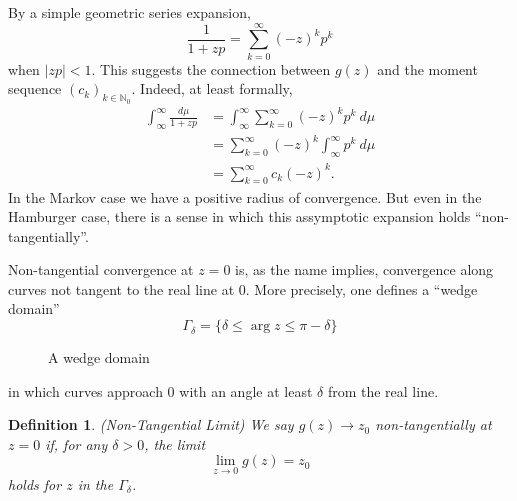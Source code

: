 \documentclass{amsart}
\newtheorem{definition}[theorem]{Definition}
\theoremstyle{remark}
\numberwithin{equation}{section}
\newcommand{\NN}{\mathbb{N}}
\begin{document}
By a simple geometric series expansion,
\[
    \frac1{1 + zp} = \sum_{k = 0}^\infty {(-z)}^k p^k 
\]
when $|zp| < 1$. This suggests the connection between $g(z)$ and the moment sequence ${(c_k)}_{k \in \NN_0}$. Indeed, at least formally,
\begin{align*}
    \int_\infty^\infty\frac{d\mu}{1+zp}
    &= \int_\infty^\infty \sum_{k = 0}^\infty {(-z)}^k p^k ~d\mu \\
    &= \sum_{k = 0}^\infty {(-z)}^k \int_\infty^\infty p^k ~d\mu \\
    &= \sum_{k = 0}^\infty c_k{(-z)}^k.
\end{align*}
In the Markov case we have a positive radius of convergence. But even in the Hamburger case, there is a sense in which this assymptotic expansion holds ``non-tangentially''.

Non-tangential convergence at $z = 0$ is, as the name implies, convergence along curves not tangent to the real line at $0$. More precisely, one defines a ``wedge domain''
\[
    \Gamma_\delta = \{\delta \leq \arg z \leq \pi - \delta\}
\]
\begin{figure}
    \caption{A wedge domain}\label{fig:wedge}
\end{figure}
in which curves approach $0$ with an angle at least $\delta$ from the real line.

\begin{definition} (Non-Tangential Limit)
    We say $g(z) \rightarrow z_0$ non-tangentially at $z = 0$ if, for any $\delta > 0$, the limit 
    \[
        \lim_{z \rightarrow 0} g(z) = z_0
    \]
    holds for $z$ in the $\Gamma_\delta$.
\end{definition}
\end{document}
